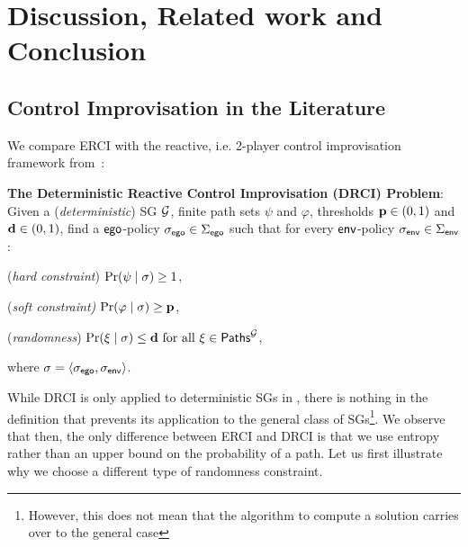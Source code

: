 \section{Discussion, Related work and Conclusion}

\subsection{Control Improvisation in the Literature}

We compare ERCI with the reactive, i.e. 2-player control improvisation framework from~\cite{DBLP:conf/cav/FremontS18}:
\begin{mdframed}
\textbf{The Deterministic Reactive Control Improvisation (DRCI) Problem}:
Given a (\emph{deterministic}) SG $\mathcal{G}$, finite path sets $\psi$ and $\varphi$,  thresholds $\mathbf{p} \in (0,1)$ and $\mathbf{d} \in (0,1)$,  find a $\mathsf{ego}$-policy ${\sigma_{\mathsf{ego}}} \in \Sigma_{\mathsf{ego}}$  such that for every $\mathsf{env}$-policy ${\sigma_{\mathsf{env}}} \in \Sigma_{\mathsf{env}}$: 
\begin{compactenum}
\item (\emph{hard constraint}) $\Pr(\psi \mid \sigma) \geq 1$,
	\item (\emph{soft constraint)} $\Pr(\varphi \mid \sigma) \geq \mathbf{p}$,
	\item (\emph{randomness}) $\Pr(\xi \mid \sigma) \leq \mathbf{d} \text{ for all } \xi \in \mathsf{Paths}^{\mathcal{G}}_{}$,
\end{compactenum}
where  $\sigma = \langle {\sigma_{\mathsf{ego}}}, {\sigma_{\mathsf{env}}} \rangle$.
\end{mdframed}
While DRCI is only applied to deterministic SGs in \cite{DBLP:conf/cav/FremontS18}, there is nothing in the definition that prevents its application to the general class of SGs\footnote{However, this does not mean that the algorithm to compute a solution carries over to the general case}.
We observe that then, the only difference between ERCI and DRCI is that we use entropy rather than an upper bound on the probability of a path.  Let us first illustrate why we choose a different type of randomness constraint.
